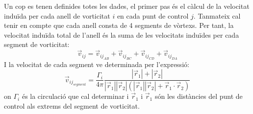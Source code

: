 Un cop es tenen definides totes les dades, el primer pas és el càlcul de la velocitat induïda per cada anell de vorticitat $i$ en cada punt de control $j$. Tanmateix cal tenir en compte que cada anell consta de 4 segments de vòrtexs. Per tant, la velocitat induïda total de l'anell és la suma de les velocitats induïdes per cada segment de vorticitat:
\begin{equation}
\vec{v}_{ij}=\vec{v}_{ij_{AB}}+\vec{v}_{ij_{BC}}+\vec{v}_{ij_{CD}}+\vec{v}_{ij_{DA}}
\end{equation}
I la velocitat de cada segment ve determinada per l'expressió:
\begin{equation}
\vec{v}_{ij_{segment}}=\frac{\Gamma_{i}}{4\pi}\frac{|\vec{r}_{1}|+|\vec{r}_{2}|}{|\vec{r}_{1}||\vec{r}_{2}|(|\vec{r}_{1}||\vec{r}_{2}|+\vec{r}_{1}\cdot\vec{r}_{2})}
\end{equation}
on $\Gamma_{i}$ és la circulació que cal determinar i $\vec{r}_{1}$ i $\vec{r}_{1}$ són les distàncies del punt de control als extrems del segment de vorticitat.


